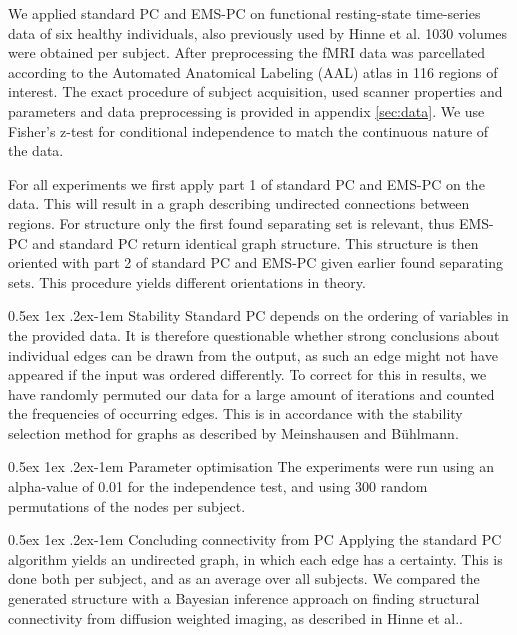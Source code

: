 \documentclass[a4paper, 10pt, english, onecolumn]{article}
\makeatletter
\renewcommand{\paragraph}{%
  \@startsection{paragraph}{4}%
  {\z@}{0.5ex \@plus 1ex \@minus .2ex}{-1em}%
  {\normalfont\normalsize\bfseries}%
}
\makeatother
\begin{document}
We applied standard PC and EMS-PC on functional resting-state time-series data of six healthy individuals, also previously used by Hinne et al\cite{hinne2013}.
1030 volumes were obtained per subject.
After preprocessing the fMRI data was parcellated according to the Automated Anatomical Labeling (AAL) atlas in 116 regions of interest.
The exact procedure of subject acquisition, used scanner properties and parameters and data preprocessing is provided in appendix \ref{sec:data}.
We use Fisher's z-test for conditional independence to match the continuous nature of the data.

For all experiments we first apply part 1 of standard PC and EMS-PC on the data.
This will result in a graph describing undirected connections between regions.
For structure only the first found separating set is relevant, thus EMS-PC and standard PC return identical graph structure.
This structure is then oriented with part 2 of standard PC and EMS-PC given earlier found separating sets.
This procedure yields different orientations in theory.

\paragraph{Stability}
Standard PC depends on the ordering of variables in the provided data\cite[p.120-122]{spirtes2000}.
It is therefore questionable whether strong conclusions about individual edges can be drawn from the output, as such an edge might not have appeared if the input was ordered differently.
To correct for this in results, we have randomly permuted our data for a large amount of iterations and counted the frequencies of occurring edges.
This is in accordance with the stability selection method for graphs as described by Meinshausen and B{\"u}hlmann\cite{meinshausen2010}.

\paragraph{Parameter optimisation}
The experiments were run using an alpha-value of 0.01 for the independence test, and using 300 random permutations of the nodes per subject.

\paragraph{Concluding connectivity from PC}
Applying the standard PC algorithm yields an undirected graph, in which each edge has a certainty.
This is done both per subject, and as an average over all subjects.
We compared the generated structure with a Bayesian inference approach on finding structural connectivity from diffusion weighted imaging, as described in Hinne et al.\cite{hinne2013}.
\end{document}
